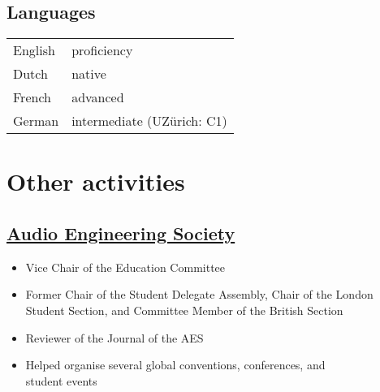 \documentclass[letterpaper]{deedy-resume} %
\begin{document}
{\begin{minipage}[t]{0.33\textwidth}
\sectionspace %
\subsection{Languages}

\begin{tabular}{@{}ll}
English & proficiency\\
Dutch & native\\
French & advanced\\
German & intermediate (UZ\"{u}rich: C1)\\
\end{tabular}


\sectionspace %
\sectionspace %



\section{Other activities} 
\subsection{\href{http://www.aes.org}{Audio Engineering Society}}
\begin{itemize}[noitemsep,nolistsep,leftmargin=*]
\item Vice Chair of the Education Committee
\item Former Chair of the Student Delegate Assembly, Chair of the London Student Section, and Committee Member of the British Section
\item Reviewer of the Journal of the AES
\item Helped organise several global conventions, conferences, and\\ student events
\end{itemize}


\end{minipage} %
\hfill
%
%
\begin{minipage}[t]{0.66\textwidth} %


\end{minipage}}
\end{document}
